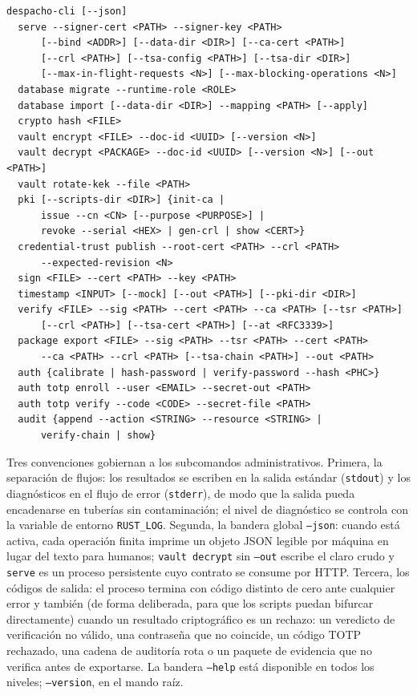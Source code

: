 \begin{lstlisting}[numbers=none]
despacho-cli [--json]
  serve --signer-cert <PATH> --signer-key <PATH>
      [--bind <ADDR>] [--data-dir <DIR>] [--ca-cert <PATH>]
      [--crl <PATH>] [--tsa-config <PATH>] [--tsa-dir <DIR>]
      [--max-in-flight-requests <N>] [--max-blocking-operations <N>]
  database migrate --runtime-role <ROLE>
  database import [--data-dir <DIR>] --mapping <PATH> [--apply]
  crypto hash <FILE>
  vault encrypt <FILE> --doc-id <UUID> [--version <N>]
  vault decrypt <PACKAGE> --doc-id <UUID> [--version <N>] [--out <PATH>]
  vault rotate-kek --file <PATH>
  pki [--scripts-dir <DIR>] {init-ca |
      issue --cn <CN> [--purpose <PURPOSE>] |
      revoke --serial <HEX> | gen-crl | show <CERT>}
  credential-trust publish --root-cert <PATH> --crl <PATH>
      --expected-revision <N>
  sign <FILE> --cert <PATH> --key <PATH>
  timestamp <INPUT> [--mock] [--out <PATH>] [--pki-dir <DIR>]
  verify <FILE> --sig <PATH> --cert <PATH> --ca <PATH> [--tsr <PATH>]
      [--crl <PATH>] [--tsa-cert <PATH>] [--at <RFC3339>]
  package export <FILE> --sig <PATH> --tsr <PATH> --cert <PATH>
      --ca <PATH> --crl <PATH> [--tsa-chain <PATH>] --out <PATH>
  auth {calibrate | hash-password | verify-password --hash <PHC>}
  auth totp enroll --user <EMAIL> --secret-out <PATH>
  auth totp verify --code <CODE> --secret-file <PATH>
  audit {append --action <STRING> --resource <STRING> |
      verify-chain | show}
\end{lstlisting}

Tres convenciones gobiernan a los subcomandos administrativos. Primera, la separación de flujos: los resultados se escriben en la salida estándar (\texttt{stdout}) y los diagnósticos en el flujo de error (\texttt{stderr}), de modo que la salida pueda encadenarse en tuberías sin contaminación; el nivel de diagnóstico se controla con la variable de entorno \texttt{RUST\_LOG}. Segunda, la bandera global \texttt{--json}: cuando está activa, cada operación finita imprime un objeto JSON legible por máquina en lugar del texto para humanos; \texttt{vault decrypt} sin \texttt{--out} escribe el claro crudo y \texttt{serve} es un proceso persistente cuyo contrato se consume por HTTP. Tercera, los códigos de salida: el proceso termina con código distinto de cero ante cualquier error y también (de forma deliberada, para que los scripts puedan bifurcar directamente) cuando un resultado criptográfico es un rechazo: un veredicto de verificación no válido, una contraseña que no coincide, un código TOTP rechazado, una cadena de auditoría rota o un paquete de evidencia que no verifica antes de exportarse. La bandera \texttt{--help} está disponible en todos los niveles; \texttt{--version}, en el mando raíz.

